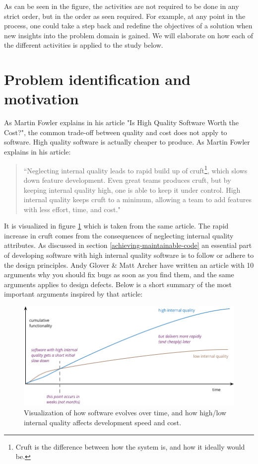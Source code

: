 \documentclass[pdftex,10pt,b5paper,twoside]{report}
\begin{document}
As can be seen in the figure, the activities are not required to be done in any strict order, but in the order as seen required. For example, at any point in the process, one could take a step back and redefine the objectives of a solution when new insights into the problem domain is gained. We will elaborate on how each of the different activities is applied to the study below. 

\section{Problem identification and motivation}
\label{problem-identification-and-motiviation}

As Martin Fowler explains in his article "Is High Quality Software Worth the Cost?"\cite{is-high-quality-softaware-worth-it}, the common trade-off between quality and cost does not apply to software. High quality software is actually cheaper to produce. As Martin Fowler explains in his article:

\begin{quote}
    ``Neglecting internal quality leads to rapid build up of cruft\footnote{Cruft is the difference between how the system is, and how it ideally would be.}, which slows down feature development. Even great teams produces cruft, but by keeping internal quality high, one is able to keep it under control. High internal quality keeps cruft to a minimum, allowing a team to add features with less effort, time, and cost."
\end{quote} 
It is visualized in figure \ref{fig:internal-quality-graph} which is taken from the same article. The rapid increase in cruft comes from the consequences of neglecting internal quality attributes. As discussed in section \ref{achieving-maintainable-code} an essential part of developing software with high internal quality software is to follow or adhere to the design principles. Andy Glover \& Matt Archer have written an article with 10 arguments why you should fix bugs as soon as you find them\cite{10reasons}, and the same arguments applies to design defects. Below is a short summary of the most important arguments inspired by that article:

\begin{figure}[h!]
    \centering
    \includegraphics[width=\linewidth]{report/internal-quality-graph.png}
    \caption{Visualization of how software evolves over time, and how high/low internal quality affects development speed and cost.}
    \label{fig:internal-quality-graph}
\end{figure}
\end{document}
